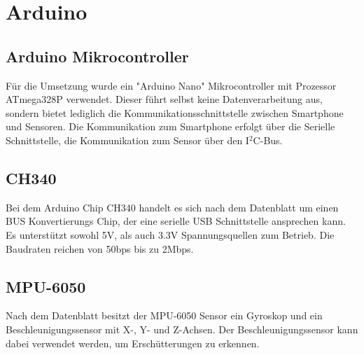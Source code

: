 \section{Arduino}
\label{sec:Arduino}

\subsection*{Arduino Mikrocontroller}
Für die Umsetzung wurde ein "Arduino Nano" Mikrocontroller mit Prozessor ATmega328P verwendet. Dieser führt selbst keine Datenverarbeitung aus, sondern bietet lediglich die Kommunikationsschnittstelle zwischen Smartphone und Sensoren. Die Kommunikation zum Smartphone erfolgt über die Serielle Schnittstelle, die Kommunikation zum Sensor über den I$^2$C-Bus. 


\subsection*{CH340}
Bei dem Arduino Chip CH340 handelt es sich nach dem Datenblatt \cite{CH340} um einen BUS Konvertierungs Chip, der eine serielle USB Schnittstelle ansprechen kann.
Es unterstützt sowohl 5V, als auch 3.3V Spannungsquellen zum Betrieb.
Die Baudraten reichen von 50bps bis zu 2Mbps.


\subsection*{MPU-6050}
Nach dem Datenblatt \cite{MPU6050} besitzt der MPU-6050 Sensor ein Gyroskop und ein Beschleunigungssensor mit X-, Y- und Z-Achsen.
Der Beschleunigungssensor kann dabei verwendet werden, um Erschütterungen zu erkennen.
